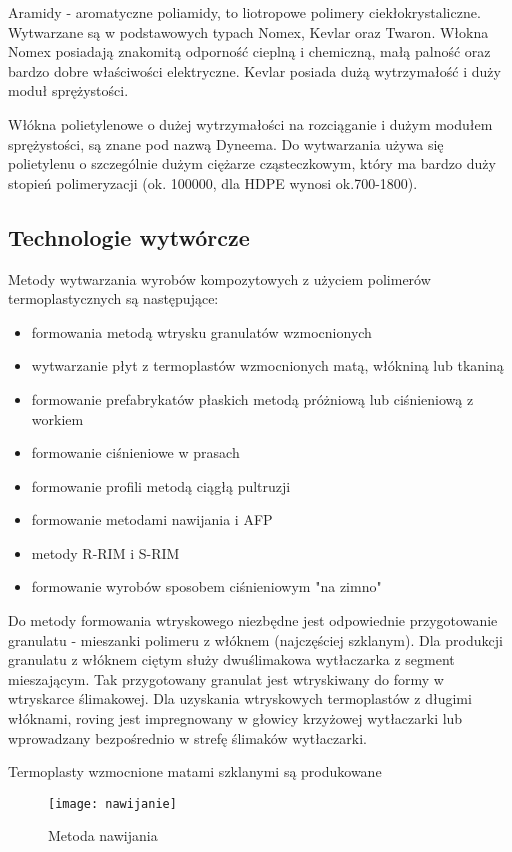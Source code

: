 \documentclass[magister,druk]{dyplom}
\begin{document}
Aramidy - aromatyczne poliamidy, to liotropowe polimery ciekłokrystaliczne. Wytwarzane są w podstawowych typach Nomex, Kevlar oraz Twaron. Włokna Nomex posiadają znakomitą odporność cieplną i chemiczną, małą palność oraz bardzo dobre właściwości elektryczne. Kevlar posiada dużą wytrzymałość i duży moduł sprężystości. 

Włókna polietylenowe o dużej wytrzymałości na rozciąganie i dużym modułem sprężystości, są znane pod nazwą Dyneema. Do wytwarzania używa się polietylenu o szczególnie dużym ciężarze cząsteczkowym, który ma bardzo duży stopień polimeryzacji (ok. 100000, dla HDPE wynosi ok.700-1800). 

\subsection{Technologie wytwórcze}

Metody wytwarzania wyrobów kompozytowych z użyciem polimerów termoplastycznych są następujące:
\begin{itemize}	
	\item formowania metodą wtrysku granulatów wzmocnionych
	\item wytwarzanie płyt z termoplastów wzmocnionych matą, włókniną lub tkaniną
	\item formowanie prefabrykatów płaskich metodą próżniową lub ciśnieniową z workiem
	\item formowanie ciśnieniowe w prasach
	\item formowanie profili metodą ciągłą pultruzji
	\item formowanie metodami nawijania i AFP
	\item metody R-RIM i S-RIM
	\item formowanie wyrobów sposobem ciśnieniowym "na zimno"
\end{itemize}

Do metody formowania wtryskowego niezbędne jest odpowiednie przygotowanie granulatu - mieszanki polimeru z włóknem (najczęściej szklanym). Dla produkcji granulatu z włóknem ciętym służy dwuślimakowa wytłaczarka z segment mieszającym. Tak przygotowany granulat jest wtryskiwany do formy w wtryskarce ślimakowej. Dla uzyskania wtryskowych termoplastów z długimi włóknami, roving jest impregnowany w głowicy krzyżowej wytłaczarki lub wprowadzany bezpośrednio w strefę ślimaków wytłaczarki.

Termoplasty wzmocnione matami szklanymi są produkowane 

\begin{figure}[H]
	\texttt{[image: nawijanie]}
	\caption{Metoda nawijania\cite{Chawla1998}}
\end{figure}
\end{document}
